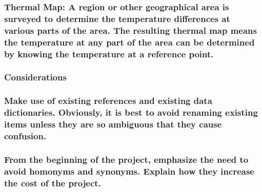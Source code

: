 \documentclass[
]{article}
\begin{document}
\hypertarget{thermal-map-a-region-or-other-geographical-area-is-surveyed-to-determine-the-temperature-differences-at-various-parts-of-the-area.-the-resulting-thermal-map-means-the-temperature-at-any-part-of-the-area-can-be-determined-by-knowing-the-temperature-at-a-reference-point.}{%
\subsubsection{Thermal Map: A region or other geographical area is
surveyed to determine the temperature differences at various parts of
the area. The resulting thermal map means the temperature at any part of
the area can be determined by knowing the temperature at a reference
point.}\label{thermal-map-a-region-or-other-geographical-area-is-surveyed-to-determine-the-temperature-differences-at-various-parts-of-the-area.-the-resulting-thermal-map-means-the-temperature-at-any-part-of-the-area-can-be-determined-by-knowing-the-temperature-at-a-reference-point.}}

\hypertarget{considerations-10}{%
\subsubsection{Considerations}\label{considerations-10}}

\hypertarget{make-use-of-existing-references-and-existing-data-dictionaries.-obviously-it-is-best-to-avoid-renaming-existing-items-unless-they-are-so-ambiguous-that-they-cause-confusion.}{%
\subsubsection{Make use of existing references and existing data
dictionaries. Obviously, it is best to avoid renaming existing items
unless they are so ambiguous that they cause
confusion.}\label{make-use-of-existing-references-and-existing-data-dictionaries.-obviously-it-is-best-to-avoid-renaming-existing-items-unless-they-are-so-ambiguous-that-they-cause-confusion.}}

\hypertarget{from-the-beginning-of-the-project-emphasize-the-need-to-avoid-homonyms-and-synonyms.-explain-how-they-increase-the-cost-of-the-project.}{%
\subsubsection{From the beginning of the project, emphasize the need to
avoid homonyms and synonyms. Explain how they increase the cost of the
project.}\label{from-the-beginning-of-the-project-emphasize-the-need-to-avoid-homonyms-and-synonyms.-explain-how-they-increase-the-cost-of-the-project.}}
\end{document}
